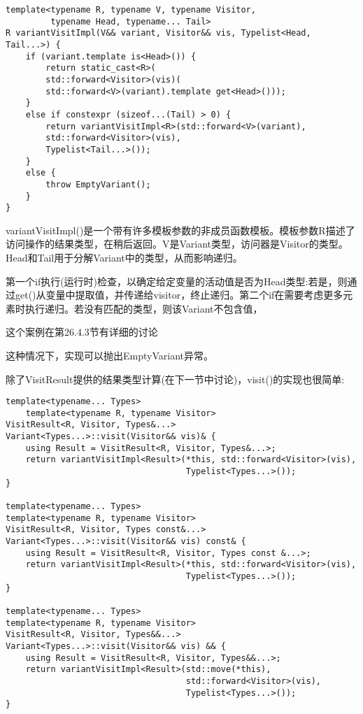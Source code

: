 \begin{lstlisting}[style=styleCXX]
template<typename R, typename V, typename Visitor,
		 typename Head, typename... Tail>
R variantVisitImpl(V&& variant, Visitor&& vis, Typelist<Head, Tail...>) {
	if (variant.template is<Head>()) {
		return static_cast<R>(
		std::forward<Visitor>(vis)(
		std::forward<V>(variant).template get<Head>()));
	}
	else if constexpr (sizeof...(Tail) > 0) {
		return variantVisitImpl<R>(std::forward<V>(variant),
		std::forward<Visitor>(vis),
		Typelist<Tail...>());
	}
	else {
		throw EmptyVariant();
	}
}
\end{lstlisting}

variantVisitImpl()是一个带有许多模板参数的非成员函数模板。模板参数R描述了访问操作的结果类型，在稍后返回。V是Variant类型，访问器是Visitor的类型。Head和Tail用于分解Variant中的类型，从而影响递归。

第一个if执行(运行时)检查，以确定给定变量的活动值是否为Head类型:若是，则通过get()从变量中提取值，并传递给visitor，终止递归。第二个if在需要考虑更多元素时执行递归。若没有匹配的类型，则该Variant不包含值，

\begin{tcolorbox}[colback=webgreen!5!white,colframe=webgreen!75!black]
\hspace*{0.75cm}这个案例在第26.4.3节有详细的讨论
\end{tcolorbox}

这种情况下，实现可以抛出EmptyVariant异常。

除了VisitResult提供的结果类型计算(在下一节中讨论)，visit()的实现也很简单:

\begin{lstlisting}[style=styleCXX]
template<typename... Types>
	template<typename R, typename Visitor>
VisitResult<R, Visitor, Types&...>
Variant<Types...>::visit(Visitor&& vis)& {
	using Result = VisitResult<R, Visitor, Types&...>;
	return variantVisitImpl<Result>(*this, std::forward<Visitor>(vis),
									Typelist<Types...>());
}

template<typename... Types>
template<typename R, typename Visitor>
VisitResult<R, Visitor, Types const&...>
Variant<Types...>::visit(Visitor&& vis) const& {
	using Result = VisitResult<R, Visitor, Types const &...>;
	return variantVisitImpl<Result>(*this, std::forward<Visitor>(vis),
									Typelist<Types...>());
}

template<typename... Types>
template<typename R, typename Visitor>
VisitResult<R, Visitor, Types&&...>
Variant<Types...>::visit(Visitor&& vis) && {
	using Result = VisitResult<R, Visitor, Types&&...>;
	return variantVisitImpl<Result>(std::move(*this),
									std::forward<Visitor>(vis),
									Typelist<Types...>());
}
\end{lstlisting}

